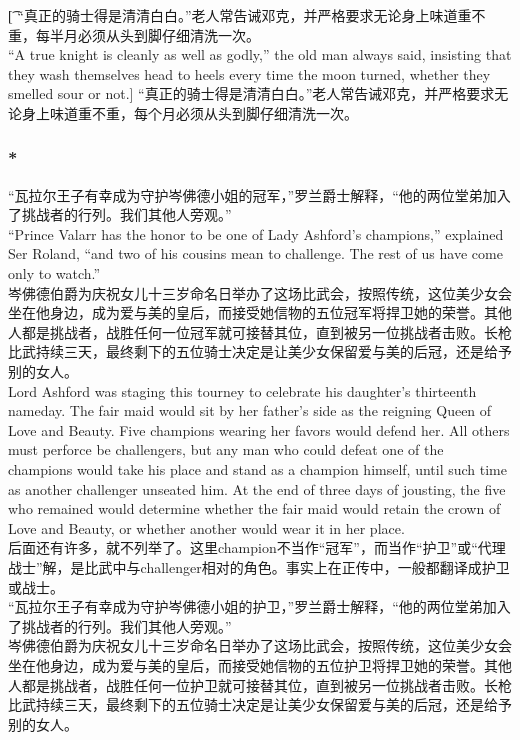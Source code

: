 \documentclass[12pt,a4paper]{article}
\newcommand{\h}[1]{{\color{red}#1}\\}
\newcommand{\la}[1]{{\color{blue}#1}\\}
\begin{document}
\subsubsection{}\t[
	“真正的骑士得是清清白白。”老人常告诫邓克，并严格要求无论身上味道重不重，每半月必须从头到脚仔细清洗一次。\\
	“A true knight is cleanly as well as godly,” the old man always said, insisting that they wash themselves head to heels every time the moon turned, whether they smelled sour or not.]
	“真正的骑士得是清清白白。”老人常告诫邓克，并严格要求无论身上味道重不重，每个月必须从头到脚仔细清洗一次。
	
\subsubsection{\color{red}*}\la{
	 “瓦拉尔王子有幸成为守护岑佛德小姐的冠军，”罗兰爵士解释，“他的两位堂弟加入了挑战者的行列。我们其他人旁观。”\\
	 “Prince Valarr has the honor to be one of Lady Ashford's champions,” explained Ser Roland, “and two of his cousins mean to challenge. The rest of us have come only to watch.”\\
	 岑佛德伯爵为庆祝女儿十三岁命名日举办了这场比武会，按照传统，这位美少女会坐在他身边，成为爱与美的皇后，而接受她信物的五位冠军将捍卫她的荣誉。其他人都是挑战者，战胜任何一位冠军就可接替其位，直到被另一位挑战者击败。长枪比武持续三天，最终剩下的五位骑士决定是让美少女保留爱与美的后冠，还是给予别的女人。\\
	 Lord Ashford was staging this tourney to celebrate his daughter's thirteenth nameday. The fair maid would sit by her father's side as the reigning Queen of Love and Beauty. Five champions wearing her favors would defend her. All others must perforce be challengers, but any man who could defeat one of the champions would take his place and stand as a champion himself, until such time as another challenger unseated him. At the end of three days of jousting, the five who remained would determine whether the fair maid would retain the crown of Love and Beauty, or whether another would wear it in her place.}\h{
	 后面还有许多，就不列举了。这里champion不当作“冠军”，而当作“护卫”或“代理战士”解，是比武中与challenger相对的角色。事实上在正传中，一般都翻译成护卫或战士。}
	 “瓦拉尔王子有幸成为守护岑佛德小姐的护卫，”罗兰爵士解释，“他的两位堂弟加入了挑战者的行列。我们其他人旁观。”\\
	 岑佛德伯爵为庆祝女儿十三岁命名日举办了这场比武会，按照传统，这位美少女会坐在他身边，成为爱与美的皇后，而接受她信物的五位护卫将捍卫她的荣誉。其他人都是挑战者，战胜任何一位护卫就可接替其位，直到被另一位挑战者击败。长枪比武持续三天，最终剩下的五位骑士决定是让美少女保留爱与美的后冠，还是给予别的女人。
\end{document}
